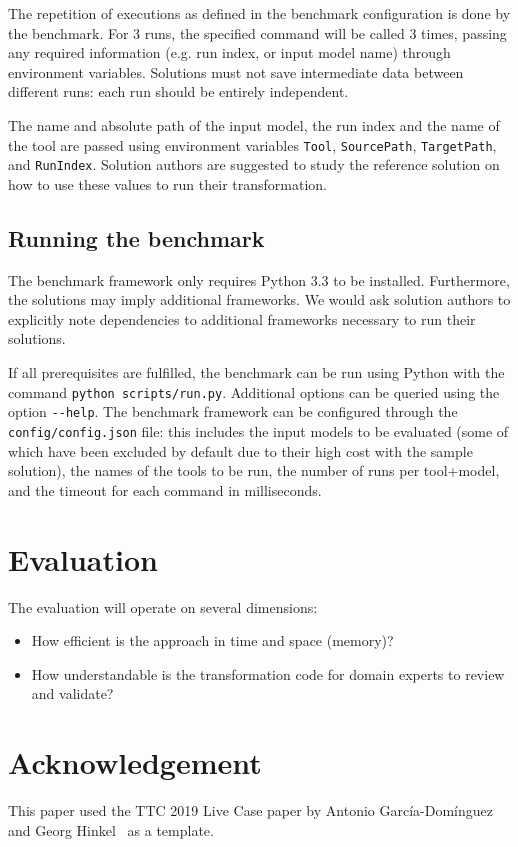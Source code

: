 \documentclass[
twocolumn,
]{ceurart}
\newcommand*{\file}[1]{\texttt{#1}}
\begin{document}
The repetition of executions as defined in the benchmark configuration is done
by the benchmark. For 3 runs, the specified command will be called 3 times,
passing any required information (e.g. run index, or input model name) through
environment variables. Solutions must not save intermediate data between
different runs: each run should be entirely independent.

The name and absolute path of the input model, the run index and the name of the
tool are passed using environment variables \file{Tool}, \file{SourcePath},
\file{TargetPath}, and \file{RunIndex}.
Solution authors are suggested to study the reference solution on how to use
these values to run their transformation.

\subsection{Running the benchmark}
\label{sec:running-benchmark}

The benchmark framework only requires Python 3.3 to be installed. Furthermore,
the solutions may imply additional frameworks. We would ask solution authors to
explicitly note dependencies to additional frameworks necessary to run their
solutions.

If all prerequisites are fulfilled, the benchmark can be run using Python with
the command \file{python scripts/run.py}. Additional options can be queried
using the option \file{{-}{-}help}. The benchmark framework can be configured
through the \file{config/config.json} file: this includes the input models to be
evaluated (some of which have been excluded by default due to their high cost
with the sample solution), the names of the tools to be run, the number of runs
per tool+model, and the timeout for each command in milliseconds.

\section{Evaluation}
\label{sec:evaluation}

The evaluation will operate on several dimensions:

\begin{itemize}
\item How efficient is the approach in time and space (memory)?

\item How understandable is the transformation code for domain experts to review and validate?
\end{itemize}

\section*{Acknowledgement}

This paper used the TTC 2019 Live Case paper by Antonio García-Domínguez and
Georg Hinkel~\cite{garcia_dominguez_ttc_2019} as a template.



\end{document}
